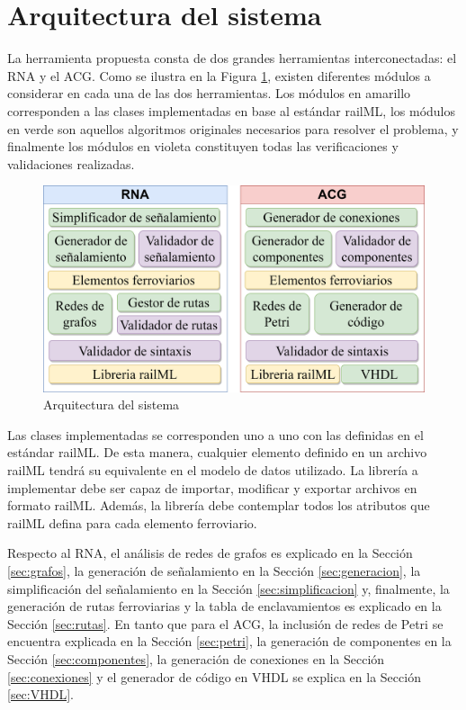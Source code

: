 \section{Arquitectura del sistema}

    La herramienta propuesta consta de dos grandes herramientas interconectadas: el RNA y el ACG. Como se ilustra en la Figura \ref{fig:architecture}, existen diferentes módulos a considerar en cada una de las dos herramientas. Los módulos en amarillo corresponden a las clases implementadas en base al estándar railML, los módulos en verde son aquellos algoritmos originales necesarios para resolver el problema, y finalmente los módulos en violeta constituyen todas las verificaciones y validaciones realizadas.

    \begin{figure}[h]
        \centering
        \includegraphics[width=1\textwidth]{Figuras/Architecture.png}
        \centering\caption{Arquitectura del sistema}
        \label{fig:architecture}
    \end{figure}

    Las clases implementadas se corresponden uno a uno con las definidas en el estándar railML. De esta manera, cualquier elemento definido en un archivo railML tendrá su equivalente en el modelo de datos utilizado. La librería a implementar debe ser capaz de importar, modificar y exportar archivos en formato railML. Además, la librería debe contemplar todos los atributos que railML defina para cada elemento ferroviario.

    Respecto al RNA, el análisis de redes de grafos es explicado en la Sección \ref{sec:grafos}, la generación de señalamiento en la Sección \ref{sec:generacion}, la simplificación del señalamiento en la Sección \ref{sec:simplificacion} y, finalmente, la generación de rutas ferroviarias y la tabla de enclavamientos es explicado en la Sección \ref{sec:rutas}. En tanto que para el ACG, la inclusión de redes de Petri se encuentra explicada en la Sección \ref{sec:petri}, la generación de componentes en la Sección \ref{sec:componentes}, la generación de conexiones en la Sección \ref{sec:conexiones} y el generador de código en VHDL se explica en la Sección \ref{sec:VHDL}.